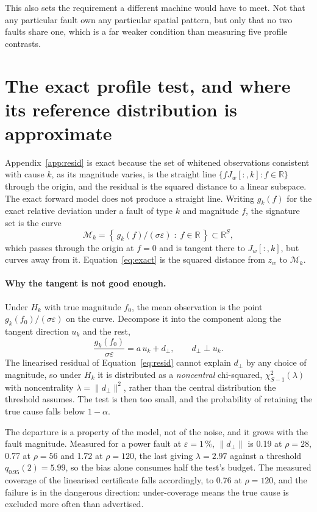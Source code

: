 \documentclass[preprint,12pt]{elsarticle}
\begin{document}
This also sets the requirement a different machine would have to meet. Not that
any particular fault own any particular spatial pattern, but only that no two
faults share one, which is a far weaker condition than measuring five profile
contrasts.


\section{The exact profile test, and where its reference distribution is
approximate}
\label{app:exact}

Appendix~\ref{app:resid} is exact because the set of whitened observations
consistent with cause $k$, as its magnitude varies, is the straight line
$\{ f J_w[:,k] : f \in \mathbb{R}\}$ through the origin, and the residual is the
squared distance to a linear subspace. The exact forward model does not produce
a straight line. Writing $g_k(f)$ for the exact relative deviation under a fault
of type $k$ and magnitude $f$, the signature set is the curve
%
\begin{equation}
\mathcal{M}_k = \left\{ \, g_k(f) / (\sigma \varepsilon)
\;:\; f \in \mathbb{R} \, \right\} \subset \mathbb{R}^S ,
\end{equation}
%
which passes through the origin at $f = 0$ and is tangent there to
$J_w[:,k]$, but curves away from it. Equation~\eqref{eq:exact} is the squared
distance from $z_w$ to $\mathcal{M}_k$.

\paragraph{Why the tangent is not good enough.} Under $H_k$ with true magnitude
$f_0$, the mean observation is the point $g_k(f_0)/(\sigma\varepsilon)$ on the
curve. Decompose it into the component along the tangent direction $u_k$ and the
rest,
%
\begin{equation}
\frac{g_k(f_0)}{\sigma \varepsilon} = a\,u_k + d_\perp,
\qquad
d_\perp \perp u_k .
\end{equation}
%
The linearised residual of Equation~\eqref{eq:resid} cannot explain $d_\perp$ by
any choice of magnitude, so under $H_k$ it is distributed as a
\emph{noncentral} chi-squared, $\chi^2_{S-1}(\lambda)$ with noncentrality
$\lambda = \lVert d_\perp \rVert^2$, rather than the central distribution the
threshold assumes. The test is then too small, and the probability of retaining
the true cause falls below $1-\alpha$.

The departure is a property of the model, not of the noise, and it grows with
the fault magnitude. Measured for a power fault at $\varepsilon = 1\,\%$,
$\lVert d_\perp \rVert$ is 0.19 at $\rho = 28$, 0.77 at $\rho = 56$ and 1.72 at
$\rho = 120$, the last giving $\lambda = 2.97$ against a threshold
$q_{0.95}(2) = 5.99$, so the bias alone consumes half the test's budget. The
measured coverage of the linearised certificate falls accordingly, to 0.76 at
$\rho = 120$, and the failure is in the dangerous direction: under-coverage
means the true cause is excluded more often than advertised.
\end{document}

